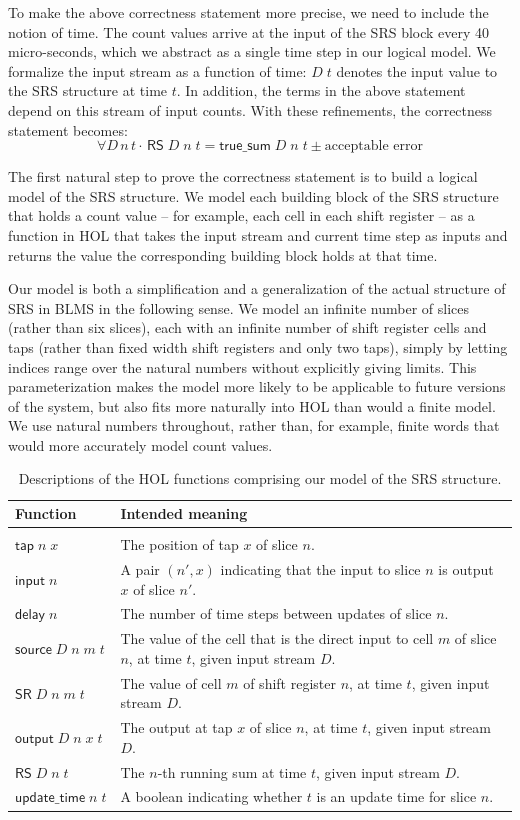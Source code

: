 \documentclass{llncs}
\begin{document}
To make the above correctness statement more precise, we need to include the notion of time.
The count values arrive at the input of the SRS block every 40 micro-seconds, which we abstract as a single time step in our logical model.
We formalize the input stream as a function of time: $D\;t$ denotes the input value to the SRS structure at time $t$.
In addition, the terms in the above statement depend on this stream of input counts.
With these refinements, the correctness statement becomes: \[\forall{D\,n\,t} \cdot \,\mathsf{RS}\;D\;n\;t = \mathsf{true\_sum}\;D\;n\;t\pm\text{acceptable error}\]

The first natural step to prove the correctness statement is to build a logical model of the SRS structure.
We model each building block of the SRS structure that holds a count value -- for example, each cell in each shift register -- as a function in HOL that takes the input stream and current time step as inputs and returns the value the corresponding building block holds at that time.

Our model is both a simplification and a generalization of the actual structure of SRS in BLMS in the following sense.
We model an infinite number of slices (rather than six slices), each with an infinite number of shift register cells and taps (rather than fixed width shift registers and only two taps), simply by letting indices range over the natural numbers without explicitly giving limits.
This parameterization makes the model more likely to be applicable to future versions of the system, but also fits more naturally into HOL than would a finite model.
We use natural numbers throughout, rather than, for example, finite words that would more accurately model count values.

\begin{table}[t]
\caption{
Descriptions of the HOL functions comprising our model of the SRS structure.
\label{tab:descriptions}
}
\begin{tabular}{lp{}}
Function&Intended meaning\\
\hline\\
\(\mathsf{tap}\;n\;x\)&The position of tap $x$ of slice $n$.\\
\(\mathsf{input}\;n\)&A pair $(n',x)$ indicating that the input to slice $n$ is output $x$ of slice $n'$.\\
\(\mathsf{delay}\;n\)&The number of time steps between updates of slice $n$.\\
\(\mathsf{source}\;D\;n\;m\;t\)&The value of the cell that is the direct input to cell $m$ of slice $n$, at time $t$, given input stream $D$.\\
\(\mathsf{SR}\;D\;n\;m\;t\)&The value of cell $m$ of shift register $n$, at time $t$, given input stream $D$.\\
\(\mathsf{output}\;D\;n\;x\;t\)&The output at tap $x$ of slice $n$, at time $t$, given input stream $D$.\\
\(\mathsf{RS}\;D\;n\;t\)&The $n$-th running sum at time $t$, given input stream $D$.\\
\(\mathsf{update\_time}\;n\;t\)&A boolean indicating whether $t$ is an update time for slice $n$.
\end{tabular}
\end{table}
\end{document}
